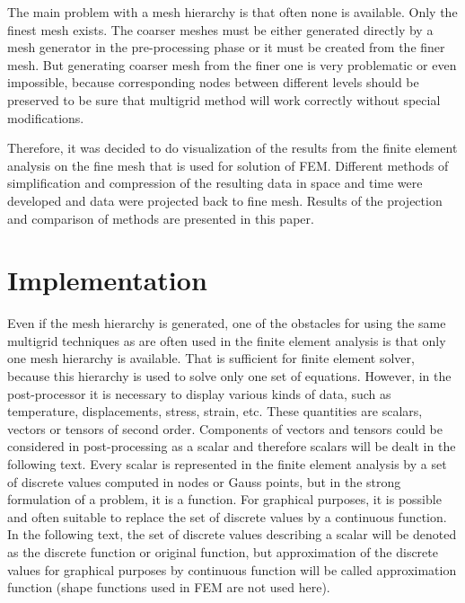 The main problem with a mesh hierarchy is that often none is available. Only the finest mesh exists. The coarser meshes must be either generated directly by a mesh generator \cite{XXX-10, XXX-11} in the pre-processing phase or it must be created from the finer mesh. But generating coarser mesh from the finer one is very problematic or even impossible, because corresponding nodes between different levels should be preserved to be sure that multigrid method will work correctly without special modifications.

Therefore, it was decided to do visualization of the results from the finite element analysis on the fine mesh that is used for solution of FEM. Different methods of simplification and compression of the resulting data in space and time were developed and data were projected back to fine mesh. Results of the projection and comparison of methods are presented in this paper.


\section{Implementation}

Even if the mesh hierarchy is generated, one of the obstacles for using the same multigrid techniques as are often used in the finite element analysis is that only one mesh hierarchy is available. That is sufficient for finite element solver, because this hierarchy is used to solve only one set of equations. However, in the post-processor it is necessary to display various kinds of data, such as temperature, displacements, stress, strain, etc. These quantities are scalars, vectors or tensors of second order. Components of vectors and tensors could be considered in post-processing as a scalar and therefore scalars will be dealt in the following text. Every scalar is represented in the finite element analysis by a set of discrete values computed in nodes or Gauss points, but in the strong formulation of a problem, it is a function. For graphical purposes, it is possible and often suitable to replace the set of discrete values by a continuous function. In the following text, the set of discrete values describing a scalar will be denoted as the discrete function or original function, but approximation of the discrete values for graphical purposes by continuous function will be called approximation function (shape functions used in FEM are not used here).

